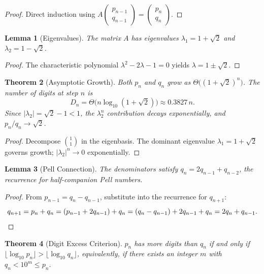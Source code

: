 \documentclass[12pt,a4paper]{article}
\newtheorem{theorem}{Theorem}
\newtheorem{lemma}[theorem]{Lemma}
\theoremstyle{definition}
\theoremstyle{remark}
\begin{document}
\begin{proof}
Direct induction using $A \begin{pmatrix} p_{n-1} \\ q_{n-1} \end{pmatrix} = \begin{pmatrix} p_n \\ q_n \end{pmatrix}$.
\end{proof}

\begin{lemma}[Eigenvalues]
The matrix $A$ has eigenvalues $\lambda_1 = 1 + \sqrt{2}$ and $\lambda_2 = 1 - \sqrt{2}$.
\end{lemma}

\begin{proof}
The characteristic polynomial $\lambda^2 - 2\lambda - 1 = 0$ yields $\lambda = 1 \pm \sqrt{2}$.
\end{proof}

\begin{theorem}[Asymptotic Growth]
Both $p_n$ and $q_n$ grow as $\Theta\bigl((1+\sqrt{2})^n\bigr)$. The number of digits at step $n$ is
\[
D_n = \Theta\bigl(n \log_{10}(1+\sqrt{2})\bigr) \approx 0.3827\, n.
\]
Since $|\lambda_2| = \sqrt{2} - 1 < 1$, the $\lambda_2^n$ contribution decays exponentially, and $p_n/q_n \to \sqrt{2}$.
\end{theorem}

\begin{proof}
Decompose $\binom{1}{1}$ in the eigenbasis. The dominant eigenvalue $\lambda_1 = 1 + \sqrt{2}$ governs growth; $|\lambda_2|^n \to 0$ exponentially.
\end{proof}

\begin{lemma}[Pell Connection]
The denominators satisfy $q_n = 2q_{n-1} + q_{n-2}$, the recurrence for half-companion Pell numbers.
\end{lemma}

\begin{proof}
From $p_{n-1} = q_n - q_{n-1}$, substitute into the recurrence for $q_{n+1}$:
\[
q_{n+1} = p_n + q_n = (p_{n-1} + 2q_{n-1}) + q_n = (q_n - q_{n-1}) + 2q_{n-1} + q_n = 2q_n + q_{n-1}. \qedhere
\]
\end{proof}

\begin{theorem}[Digit Excess Criterion]
$p_n$ has more digits than $q_n$ if and only if $\lfloor \log_{10} p_n \rfloor > \lfloor \log_{10} q_n \rfloor$, equivalently, if there exists an integer $m$ with $q_n < 10^m \leq p_n$.
\end{theorem}
\end{document}
